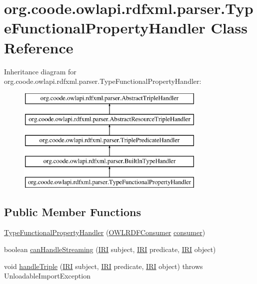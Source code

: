 \hypertarget{classorg_1_1coode_1_1owlapi_1_1rdfxml_1_1parser_1_1_type_functional_property_handler}{\section{org.\-coode.\-owlapi.\-rdfxml.\-parser.\-Type\-Functional\-Property\-Handler Class Reference}
\label{classorg_1_1coode_1_1owlapi_1_1rdfxml_1_1parser_1_1_type_functional_property_handler}
}
Inheritance diagram for org.\-coode.\-owlapi.\-rdfxml.\-parser.\-Type\-Functional\-Property\-Handler\-:\begin{figure}[H]
\begin{center}
\leavevmode
\includegraphics[height=5.000000cm]{classorg_1_1coode_1_1owlapi_1_1rdfxml_1_1parser_1_1_type_functional_property_handler}
\end{center}
\end{figure}
\subsection*{Public Member Functions}
\begin{DoxyCompactItemize}
\item 
\hyperlink{classorg_1_1coode_1_1owlapi_1_1rdfxml_1_1parser_1_1_type_functional_property_handler_a1856cfb51d98e13bd418ac1b1932e9e6}{Type\-Functional\-Property\-Handler} (\hyperlink{classorg_1_1coode_1_1owlapi_1_1rdfxml_1_1parser_1_1_o_w_l_r_d_f_consumer}{O\-W\-L\-R\-D\-F\-Consumer} \hyperlink{classorg_1_1coode_1_1owlapi_1_1rdfxml_1_1parser_1_1_abstract_triple_handler_a4ccf4d898ff01eb1cadfa04b23d54e9c}{consumer})
\item 
boolean \hyperlink{classorg_1_1coode_1_1owlapi_1_1rdfxml_1_1parser_1_1_type_functional_property_handler_a26fb8bfa8a30c51d44d9fbd8487d97cc}{can\-Handle\-Streaming} (\hyperlink{classorg_1_1semanticweb_1_1owlapi_1_1model_1_1_i_r_i}{I\-R\-I} subject, \hyperlink{classorg_1_1semanticweb_1_1owlapi_1_1model_1_1_i_r_i}{I\-R\-I} predicate, \hyperlink{classorg_1_1semanticweb_1_1owlapi_1_1model_1_1_i_r_i}{I\-R\-I} object)
\item 
void \hyperlink{classorg_1_1coode_1_1owlapi_1_1rdfxml_1_1parser_1_1_type_functional_property_handler_a7edd4b1c141d8d49b2da280d4c722c83}{handle\-Triple} (\hyperlink{classorg_1_1semanticweb_1_1owlapi_1_1model_1_1_i_r_i}{I\-R\-I} subject, \hyperlink{classorg_1_1semanticweb_1_1owlapi_1_1model_1_1_i_r_i}{I\-R\-I} predicate, \hyperlink{classorg_1_1semanticweb_1_1owlapi_1_1model_1_1_i_r_i}{I\-R\-I} object)  throws Unloadable\-Import\-Exception 
\end{DoxyCompactItemize}

